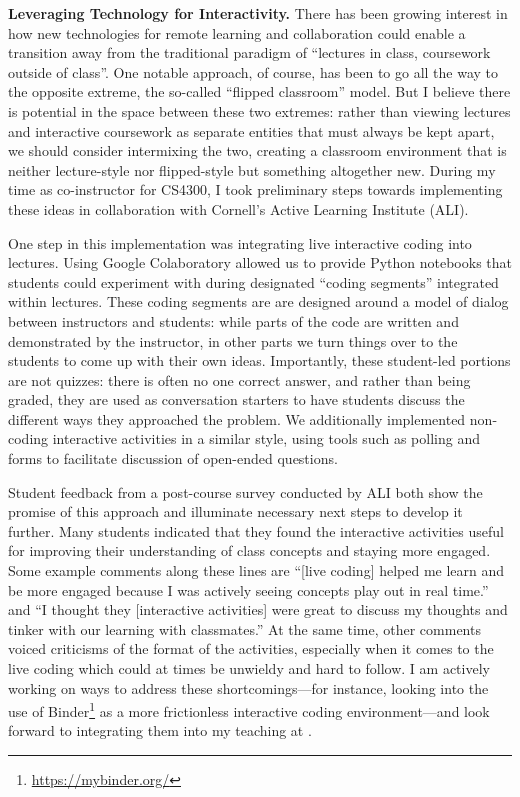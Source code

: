 \documentclass[11pt,letterpaper]{article}
\renewcommand{\section}[1]{\vspace{0.25\baselineskip}\noindent\textbf{#1.}}
\begin{document}
\section{Leveraging Technology for Interactivity}
There has been growing interest in how new technologies for remote learning and collaboration could enable a transition away from the traditional paradigm of ``lectures in class, coursework outside of class''.
One notable approach, of course, has been to go all the way to the opposite extreme, the so-called ``flipped classroom'' model.
But I believe there is potential in the space between these two extremes: rather than viewing lectures and interactive coursework as separate entities that must always be kept apart, we should consider intermixing the two, creating a classroom environment that is neither lecture-style nor flipped-style but something altogether new.
During my time as co-instructor for CS4300, I took preliminary steps towards implementing these ideas in collaboration with Cornell's Active Learning Institute (ALI).

One step in this implementation was integrating live interactive coding into lectures.
Using Google Colaboratory allowed us to provide Python notebooks that students could experiment with during designated ``coding segments'' integrated within lectures.
These coding segments are are designed around a model of dialog between instructors and students: while parts of the code are written and demonstrated by the instructor, in other parts we turn things over to the students to come up with their own ideas.
Importantly, these student-led portions are not quizzes: there is often no one correct answer, and rather than being graded, they are used as conversation starters to have students discuss the different ways they approached the problem.
We additionally implemented non-coding interactive activities in a similar style, using tools such as polling and forms to facilitate discussion of open-ended questions.

Student feedback from a post-course survey conducted by ALI both show the promise of this approach and illuminate necessary next steps to develop it further.
Many students indicated that they found the interactive activities useful for improving their understanding of class concepts and staying more engaged.
Some example comments along these lines are ``[live coding] helped me learn and be more engaged because I was actively seeing concepts play out in real time.'' and ``I thought they [interactive activities] were great to discuss my thoughts and tinker with our learning with classmates.''
At the same time, other comments voiced criticisms of the format of the activities, especially when it comes to the live coding which could at times be unwieldy and hard to follow.
I am actively working on ways to address these shortcomings---for instance, looking into the use of Binder\footnote{\url{https://mybinder.org/}} as a more frictionless interactive coding environment---and look forward to integrating them into my teaching at \schoolname.
\end{document}

